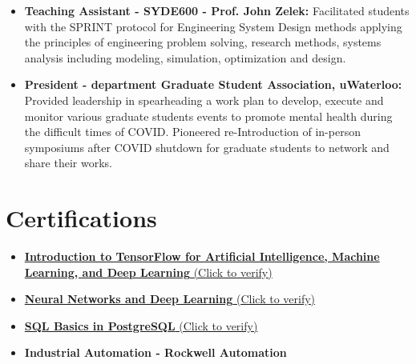 \documentclass{ExpressiveResume}
\begin{document}
\begin{itemize}
\item {\textbf{Teaching Assistant - SYDE600 - Prof. John Zelek:} Facilitated students with the SPRINT protocol for Engineering System Design methods applying the principles of engineering problem solving, research methods, systems analysis including modeling, simulation, optimization and design.}
\item {\textbf{President - department Graduate Student Association, uWaterloo:} Provided leadership in spearheading a work plan to develop, execute and monitor various graduate students events to promote mental health during the difficult times of COVID. Pioneered re-Introduction of in-person symposiums after COVID shutdown for graduate students to network and share their works.}


\end{itemize}


\section{Certifications}
\begin{itemize}
\item {\href{https://www.coursera.org/account/accomplishments/verify/C7C8CPGARXJW?utm_source=link&utm_medium=certificate&utm_content=cert_image&utm_campaign=pdf_header_button&utm_product=course}{\textbf{Introduction to TensorFlow for Artificial Intelligence, Machine Learning, and Deep Learning} (Click to verify)}}
\item {\href{https://www.coursera.org/account/accomplishments/verify/ZRBWP4ZFF8YX}{\textbf{Neural Networks and Deep Learning} (Click to verify)}}
\item {\href{https://learnsql.com/files/course-certificate/dcQdkgNWcDbdVjeWXGwKXFTHqxkLQXbYCCJYexdB}{\textbf{SQL Basics in PostgreSQL} (Click to verify)}}
\item {\textbf{Industrial Automation - Rockwell Automation}}
\newline

\end{itemize}
\end{document}
